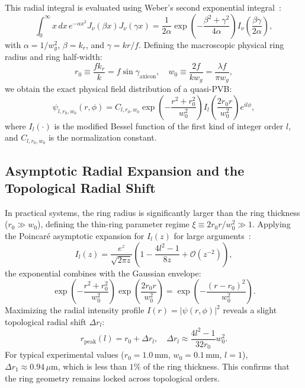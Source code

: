 \documentclass[11pt,a4paper]{article}
\begin{document}
This radial integral is evaluated using Weber's second exponential integral~\cite{Gradshteyn2014}:
\begin{equation}
\int_0^\infty x \, dx \, e^{-\alpha x^2} J_\nu(\beta x) J_\nu(\gamma x) = \frac{1}{2\alpha} \exp\left( - \frac{\beta^2 + \gamma^2}{4\alpha} \right) I_\nu\left( \frac{\beta \gamma}{2\alpha} \right),
\end{equation}
with $\alpha = 1 / w_g^2$, $\beta = k_r$, and $\gamma = k r / f$. Defining the macroscopic physical ring radius and ring half-width:
\begin{equation}
r_0 \equiv \frac{f k_r}{k} = f \sin \gamma_{\text{axicon}}, \quad w_0 \equiv \frac{2 f}{k w_g} = \frac{\lambda f}{\pi w_g},
\label{eq:pvb_params}
\end{equation}
we obtain the exact physical field distribution of a quasi-PVB:
\begin{equation}
\boxed{\psi_{l, r_0, w_0}(r, \phi) = C_{l, r_0, w_0} \exp\left( - \frac{r^2 + r_0^2}{w_0^2} \right) I_l\left( \frac{2 r_0 r}{w_0^2} \right) e^{i l \phi},}
\label{eq:exact_pvb_field}
\end{equation}
where $I_l(\cdot)$ is the modified Bessel function of the first kind of integer order $l$, and $C_{l, r_0, w_0}$ is the normalization constant.

\subsection{Asymptotic Radial Expansion and the Topological Radial Shift}

In practical systems, the ring radius is significantly larger than the ring thickness ($r_0 \gg w_0$), defining the thin-ring parameter regime $\xi \equiv 2 r_0 r / w_0^2 \gg 1$. Applying the Poincaré asymptotic expansion for $I_l(z)$ for large arguments~\cite{Gradshteyn2014}:
\begin{equation}
I_l(z) = \frac{e^z}{\sqrt{2\pi z}} \left( 1 - \frac{4l^2 - 1}{8 z} + \mathcal{O}(z^{-2}) \right),
\end{equation}
the exponential combines with the Gaussian envelope:
\begin{equation}
\exp\left( - \frac{r^2 + r_0^2}{w_0^2} \right) \exp\left( \frac{2 r_0 r}{w_0^2} \right) = \exp\left( - \frac{(r - r_0)^2}{w_0^2} \right).
\end{equation}
Maximizing the radial intensity profile $I(r) = |\psi(r, \phi)|^2$ reveals a slight topological radial shift $\Delta r_l$:
\begin{equation}
r_{\text{peak}}(l) = r_0 + \Delta r_l, \quad \Delta r_l \approx \frac{4l^2 - 1}{32 r_0} w_0^2.
\label{eq:topological_shift}
\end{equation}
For typical experimental values ($r_0 = 1.0\,\text{mm}$, $w_0 = 0.1\,\text{mm}$, $l = 1$), $\Delta r_1 \approx 0.94\,\mu\text{m}$, which is less than $1\%$ of the ring thickness. This confirms that the ring geometry remains locked across topological orders.
\end{document}
